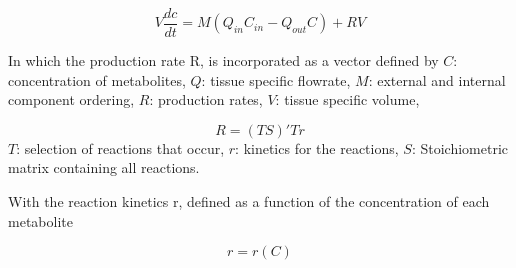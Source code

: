 \documentclass{IEEEtran}
\begin{document}
\begin{equation}
\label{eq:general_eq}
    V \frac{dc}{dt} = M (Q_{in}C_{in} - Q_{out}C) + RV
\end{equation}

In which the production rate R, is incorporated as a vector defined by
$C$: concentration of metabolites,
$Q$: tissue specific flowrate,
$M$: external and internal component ordering,
$R$: production rates,
$V$: tissue specific volume,


\begin{equation}
    R = (T S)' T r
\end{equation}
$T$: selection of reactions that occur,
$r$: kinetics for the reactions,
$S$: Stoichiometric matrix containing all reactions.

With the reaction kinetics r, defined as a function of the concentration of each metabolite

\begin{equation}
    r = r(C)
\end{equation}










\end{document}
